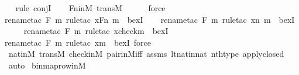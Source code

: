 \begin{isabellebody}
\ \ \isamarkupfalse%
{\isacharparenleft}{\kern0pt}rule\ conjI{\isacharparenright}{\kern0pt}\isanewline
\ \ \isamarkupfalse%
\ Fn{\isacharunderscore}{\kern0pt}in{\isacharunderscore}{\kern0pt}M\ transM\ \isanewline
\ \ \ \isamarkupfalse%
\ force\isanewline
\ \ \isamarkupfalse%
{\isacharparenleft}{\kern0pt}rename{\isacharunderscore}{\kern0pt}tac\ F\ m{\isacharcomma}{\kern0pt}\ rule{\isacharunderscore}{\kern0pt}tac\ x{\isacharequal}{\kern0pt}{\isachardoublequoteopen}F{\isacharbackquote}{\kern0pt}{\isacharless}{\kern0pt}n{\isacharcomma}{\kern0pt}\ m{\isachargreater}{\kern0pt}{\isachardoublequoteclose}\ \ bexI{\isacharparenright}{\kern0pt}\isanewline
\ \ \ \isamarkupfalse%
{\isacharparenleft}{\kern0pt}rename{\isacharunderscore}{\kern0pt}tac\ F\ m{\isacharcomma}{\kern0pt}\ rule{\isacharunderscore}{\kern0pt}tac\ x{\isacharequal}{\kern0pt}{\isachardoublequoteopen}{\isacharless}{\kern0pt}n{\isacharcomma}{\kern0pt}\ m{\isachargreater}{\kern0pt}{\isachardoublequoteclose}\ \ bexI{\isacharparenright}{\kern0pt}\isanewline
\ \ \ \ \isamarkupfalse%
{\isacharparenleft}{\kern0pt}rename{\isacharunderscore}{\kern0pt}tac\ F\ m{\isacharcomma}{\kern0pt}\ rule{\isacharunderscore}{\kern0pt}tac\ x{\isacharequal}{\kern0pt}{\isachardoublequoteopen}check{\isacharparenleft}{\kern0pt}m{\isacharparenright}{\kern0pt}{\isachardoublequoteclose}\ \ bexI{\isacharparenright}{\kern0pt}\isanewline
\ \ \ \ \ \isamarkupfalse%
{\isacharparenleft}{\kern0pt}rename{\isacharunderscore}{\kern0pt}tac\ F\ m{\isacharcomma}{\kern0pt}\ rule{\isacharunderscore}{\kern0pt}tac\ x{\isacharequal}{\kern0pt}m\ \ bexI{\isacharcomma}{\kern0pt}\ force{\isacharparenright}{\kern0pt}\isanewline
\ \ \isamarkupfalse%
\ nat{\isacharunderscore}{\kern0pt}in{\isacharunderscore}{\kern0pt}M\ transM\ check{\isacharunderscore}{\kern0pt}in{\isacharunderscore}{\kern0pt}M\ pair{\isacharunderscore}{\kern0pt}in{\isacharunderscore}{\kern0pt}M{\isacharunderscore}{\kern0pt}iff\ assms\ lt{\isacharunderscore}{\kern0pt}nat{\isacharunderscore}{\kern0pt}in{\isacharunderscore}{\kern0pt}nat\ nth{\isacharunderscore}{\kern0pt}type\ apply{\isacharunderscore}{\kern0pt}closed\isanewline
\ \ \isamarkupfalse%
\ auto%
\endisatagproof
{\isafoldproof}%
%
\isadelimproof
\isanewline
%
\endisadelimproof
\isanewline
{}\isamarkupfalse%
\ binmap{\isacharunderscore}{\kern0pt}row{\isacharprime}{\kern0pt}{\isacharunderscore}{\kern0pt}in{\isacharunderscore}{\kern0pt}M\ {\isacharcolon}{\kern0pt}\ \isanewline

\end{isabellebody}
